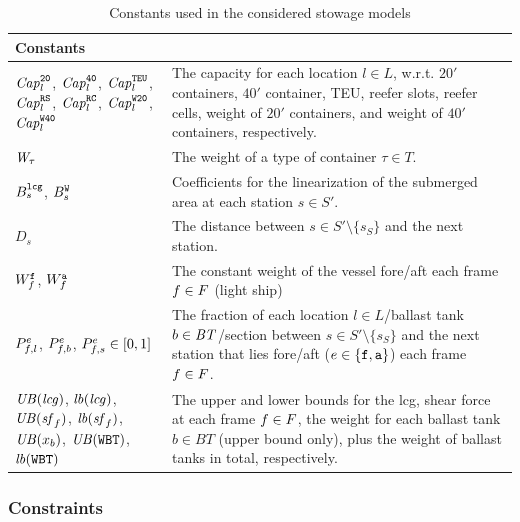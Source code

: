 \begin{table}[p]
\centering
\begin{tabular}{p{4.5cm}p{8cm}}%
\multicolumn{2}{l}{\textbf{Constants}}\\
\hline\noalign{\smallskip}
$\mathit{Cap}_l^{\texttt{20}}$, $\mathit{Cap}_l^{\texttt{40}}$, $\mathit{Cap}_l^{\texttt{TEU}}$, $\mathit{Cap}_l^{\texttt{RS}}$, $\mathit{Cap}_l^{\texttt{RC}}$, 
$\mathit{Cap}_l^{\texttt{W20}}$, $\mathit{Cap}_l^{\texttt{W40}}$
		& The capacity for each location $l\in L$, w.r.t. $20'$ containers, $40'$ container, TEU, reefer slots, reefer cells, weight of $20'$ containers, and weight of $40'$ containers, respectively.\\
$\mathit{W}_\tau$
		&The weight of a type of container $\tau\in T$.\\
$B^{\texttt{lcg}}_s$, $B^{\texttt{W}}_s$
		&{Coefficients for the linearization of the submerged area at each station $s\in S'$.}\\
$D_s$ &
		The distance between $s\in S'\setminus\{s_S\}$ and the next station.\\
$W^{\texttt{f}}_f$, $W^{\texttt{a}}_f$
		&{The constant weight of the vessel fore/aft each frame $f\in F$ (light ship)}\\
$P^{e}_{f,l}$, $P^{e}_{f,b}$, $P^{e}_{f,s}\in [0,1]$
		& The fraction of each location $l\in L$/ballast tank $b\in \mathit{BT}$/section between $s\in S'\setminus\{s_S\}$ and the next station that lies fore/aft (${e}\in\{\texttt{f},\texttt{a}\}$) each frame $f\in F$.\\
$\mathit{UB}(\mathit{lcg})$, $\mathit{lb}(\mathit{lcg})$,\newline $\mathit{UB}(\mathit{sf}_f)$, $\mathit{lb}(\mathit{sf}_f)$,\newline 
 $\mathit{UB}(x_b)$, $\mathit{UB}(\texttt{WBT})$,\newline $\mathit{lb}(\texttt{WBT})$
		&The upper and lower bounds for the lcg, shear force at each frame $f\in F$, the weight for each ballast tank $b\in BT$ (upper bound only), plus 
		the weight of ballast tanks in total, respectively.\\
\end{tabular}
\caption{Constants used in the considered stowage models}\label{table:constants}
\end{table}
%
\subsubsection*{Constraints}
